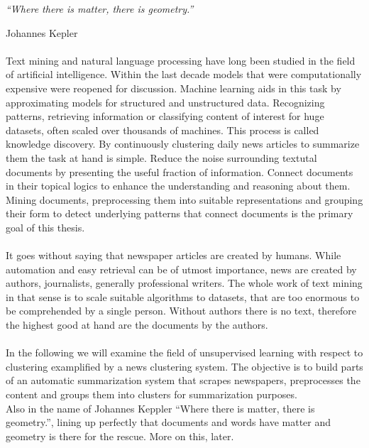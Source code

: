 \epigraph{\emph{
  ``Where there is matter, there is geometry.''
}}{ Johannes Kepler }

\paragraph{} Text mining and natural language processing have long been studied in the field of artificial intelligence. Within the last decade models that were computationally expensive were reopened for discussion. Machine learning aids in this task by approximating models for structured and unstructured data. Recognizing patterns, retrieving information or classifying content of interest for huge datasets, often scaled over thousands of machines. This process is called knowledge discovery. By continuously clustering daily news articles to summarize them the task at hand is simple. Reduce the noise surrounding textutal documents by presenting the useful fraction of information. Connect documents in their topical logics to enhance the understanding and reasoning about them. Mining documents, preprocessing them into suitable representations and grouping their form to detect underlying patterns that connect documents is the primary goal of this thesis.

\paragraph{} It goes without saying that newspaper articles are created by humans. While automation and easy retrieval can be of utmost importance, news are created by authors, journalists, generally professional writers. The whole work of text mining in that sense is to scale suitable algorithms to datasets, that are too enormous to be comprehended by a single person. Without authors there is no text, therefore the highest good at hand are the documents by the authors.

\paragraph{} In the following we will examine the field of unsupervised learning with respect to clustering examplified by a news clustering system. The objective is to build parts of an automatic summarization system that scrapes newspapers, preprocesses the content and groups them into clusters for summarization purposes.\\
Also in the name of Johannes Keppler ``Where there is matter, there is geometry.'', lining up perfectly that documents and words have matter and geometry is there for the rescue. More on this, later.

